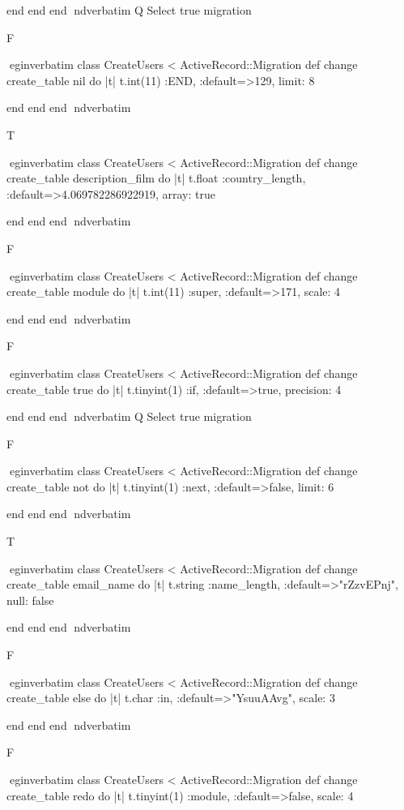     end 
  end 
end
nd{verbatim}
Q
 Select true migration

F

egin{verbatim}
 class CreateUsers < ActiveRecord::Migration 
  def change 
    create_table nil do |t| 
      t.int(11) :END, :default=>129, limit: 8
    
    end 
  end 
end
nd{verbatim}

T

egin{verbatim}
 class CreateUsers < ActiveRecord::Migration 
  def change 
    create_table description_film do |t| 
      t.float :country_length, :default=>4.069782286922919, array: true
    
    end 
  end 
end
nd{verbatim}

F

egin{verbatim}
 class CreateUsers < ActiveRecord::Migration 
  def change 
    create_table module do |t| 
      t.int(11) :super, :default=>171, scale: 4
    
    end 
  end 
end
nd{verbatim}

F

egin{verbatim}
 class CreateUsers < ActiveRecord::Migration 
  def change 
    create_table true do |t| 
      t.tinyint(1) :if, :default=>true, precision: 4
    
    end 
  end 
end
nd{verbatim}
Q
 Select true migration

F

egin{verbatim}
 class CreateUsers < ActiveRecord::Migration 
  def change 
    create_table not do |t| 
      t.tinyint(1) :next, :default=>false, limit: 6
    
    end 
  end 
end
nd{verbatim}

T

egin{verbatim}
 class CreateUsers < ActiveRecord::Migration 
  def change 
    create_table email_name do |t| 
      t.string :name_length, :default=>"rZzvEPnj", null: false
    
    end 
  end 
end
nd{verbatim}

F

egin{verbatim}
 class CreateUsers < ActiveRecord::Migration 
  def change 
    create_table else do |t| 
      t.char :in, :default=>"YsuuAAvg", scale: 3
    
    end 
  end 
end
nd{verbatim}

F

egin{verbatim}
 class CreateUsers < ActiveRecord::Migration 
  def change 
    create_table redo do |t| 
      t.tinyint(1) :module, :default=>false, scale: 4
    

